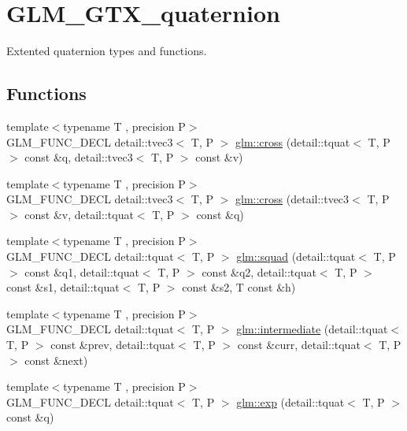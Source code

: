 \hypertarget{group__gtx__quaternion}{}\section{G\+L\+M\+\_\+\+G\+T\+X\+\_\+quaternion}
\label{group__gtx__quaternion}


Extented quaternion types and functions.  


\subsection*{Functions}
\begin{DoxyCompactItemize}
\item 
{\footnotesize template$<$typename T , precision P$>$ }\\G\+L\+M\+\_\+\+F\+U\+N\+C\+\_\+\+D\+E\+CL detail\+::tvec3$<$ T, P $>$ \hyperlink{group__gtx__quaternion_ga8b5c3ff869c773f26d0a562dfcd3f9e4}{glm\+::cross} (detail\+::tquat$<$ T, P $>$ const \&q, detail\+::tvec3$<$ T, P $>$ const \&v)
\item 
{\footnotesize template$<$typename T , precision P$>$ }\\G\+L\+M\+\_\+\+F\+U\+N\+C\+\_\+\+D\+E\+CL detail\+::tvec3$<$ T, P $>$ \hyperlink{group__gtx__quaternion_ga7794f940ba271ff846ea706204b0259a}{glm\+::cross} (detail\+::tvec3$<$ T, P $>$ const \&v, detail\+::tquat$<$ T, P $>$ const \&q)
\item 
{\footnotesize template$<$typename T , precision P$>$ }\\G\+L\+M\+\_\+\+F\+U\+N\+C\+\_\+\+D\+E\+CL detail\+::tquat$<$ T, P $>$ \hyperlink{group__gtx__quaternion_ga5e756a5817856a3d69f0974fac8322e2}{glm\+::squad} (detail\+::tquat$<$ T, P $>$ const \&q1, detail\+::tquat$<$ T, P $>$ const \&q2, detail\+::tquat$<$ T, P $>$ const \&s1, detail\+::tquat$<$ T, P $>$ const \&s2, T const \&h)
\item 
{\footnotesize template$<$typename T , precision P$>$ }\\G\+L\+M\+\_\+\+F\+U\+N\+C\+\_\+\+D\+E\+CL detail\+::tquat$<$ T, P $>$ \hyperlink{group__gtx__quaternion_ga96cb50103d939ea50d8b80bc898b2a35}{glm\+::intermediate} (detail\+::tquat$<$ T, P $>$ const \&prev, detail\+::tquat$<$ T, P $>$ const \&curr, detail\+::tquat$<$ T, P $>$ const \&next)
\item 
{\footnotesize template$<$typename T , precision P$>$ }\\G\+L\+M\+\_\+\+F\+U\+N\+C\+\_\+\+D\+E\+CL detail\+::tquat$<$ T, P $>$ \hyperlink{group__gtx__quaternion_gaadebfad5c8b4b3dde114915f0494b739}{glm\+::exp} (detail\+::tquat$<$ T, P $>$ const \&q)

\end{DoxyCompactItemize}
